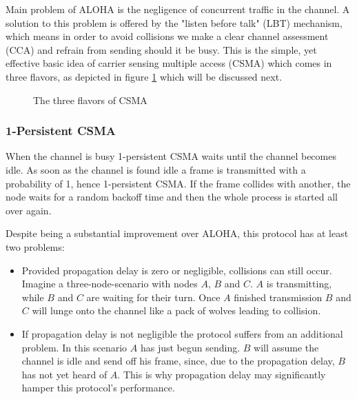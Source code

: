 Main problem of ALOHA is the negligence of concurrent traffic in the channel. A solution to this problem is offered by the "listen before talk" (LBT) mechanism, which means in order to avoid collisions we make a clear channel assessment (CCA) and refrain from sending should it be busy. This is the simple, yet effective basic idea of carrier sensing multiple access (CSMA) which comes in three flavors, as depicted in figure \ref{fig:csma-flavors} which will be discussed next.

\begin{figure}[tb] \label{fig:csma-flavors}
	\begin{center}
		\qquad
		\qquad
	\end{center}
\caption{The three flavors of CSMA}
\end{figure}


\subsubsection{1-Persistent CSMA}

When the channel is busy 1-persistent CSMA waits until the channel becomes idle. As soon as the channel is found idle a frame is transmitted with a probability of 1, hence 1-persistent CSMA. If the frame collides with another, the node waits for a random backoff time and then the whole process is started all over again.

Despite being a substantial improvement over ALOHA, this protocol has at least two problems:

\begin{itemize}
	\item Provided propagation delay is zero or negligible, collisions can still occur.  Imagine a three-node-scenario with nodes $A$, $B$ and $C$. $A$ is transmitting, while $B$ and $C$ are waiting for their turn. Once $A$ finished transmission $B$ and $C$ will lunge onto the channel like a pack of wolves leading to collision.
	
	\item If propagation delay is not negligible the protocol suffers from an additional problem. In this scenario $A$ has just begun sending. $B$ will assume the channel is idle and send off his frame, since, due to the propagation delay, $B$ has not yet heard of $A$. This is why propagation delay may significantly hamper this protocol's performance.
\end{itemize}  

